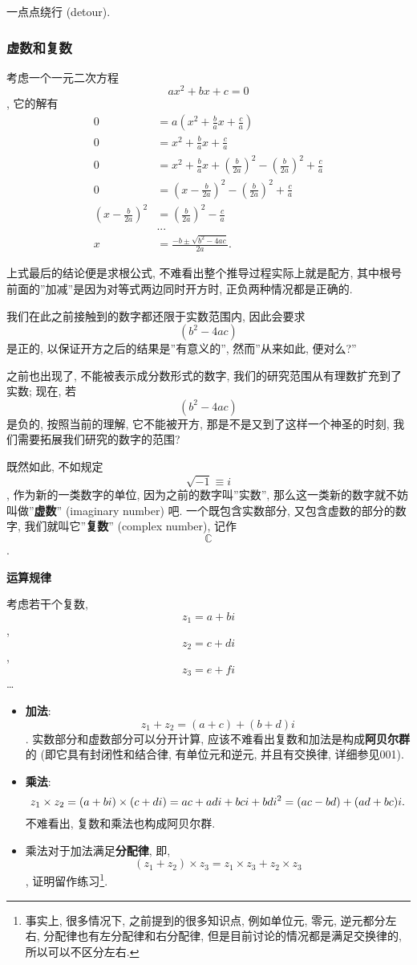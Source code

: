 一点点绕行 (detour).

\hypertarget{ux865aux6570ux548cux590dux6570}{%
\subsubsection{虚数和复数}\label{ux865aux6570ux548cux590dux6570}}

考虑一个一元二次方程 \[ax^2+bx+c=0\], 它的解有 \[
\begin{align*}
0&=a\left(x^2+\frac{b}{a}x+\frac{c}{a}\right)\\
0&=x^2+\frac{b}{a}x+\frac{c}{a}\\
0&=x^2+\frac{b}{a}x+\left(\frac{b}{2a}\right)^2-\left(\frac{b}{2a}\right)^2+\frac{c}{a}\\
0&=\left(x-\frac{b}{2a}\right)^2-\left(\frac{b}{2a}\right)^2+\frac{c}{a}\\
\left(x-\frac{b}{2a}\right)^2&=\left(\frac{b}{2a}\right)^2-\frac{c}{a}\\
&...\\
x&=\boxed{\frac{-b\pm\sqrt{b^2-4ac}}{2a}}.
\end{align*}
\]

上式最后的结论便是求根公式, 不难看出整个推导过程实际上就是配方,
其中根号前面的''加减''是因为对等式两边同时开方时,
正负两种情况都是正确的.

我们在此之前接触到的数字都还限于实数范围内, 因此会要求
\[\left(b^2-4ac\right)\] 是正的, 以保证开方之后的结果是''有意义的'',
然而''从来如此, 便对么?''

之前也出现了, 不能被表示成分数形式的数字,
我们的研究范围从有理数扩充到了实数; 现在, 若 \[\left(b^2-4ac\right)\]
是负的, 按照当前的理解, 它不能被开方, 那是不是又到了这样一个神圣的时刻,
我们需要拓展我们研究的数字的范围?

既然如此, 不如规定 \[\sqrt{-1}\equiv i\], 作为新的一类数字的单位,
因为之前的数字叫''实数'', 那么这一类新的数字就不妨叫做''\textbf{虚数}''
(imaginary number) 吧. 一个既包含实数部分, 又包含虚数的部分的数字,
我们就叫它''\textbf{复数}'' (complex number), 记作 \[\mathbb{C}\].

\textbf{运算规律}

考虑若干个复数, \[z_1=a+bi\], \[z_2=c+di\], \[z_3=e+fi\]\ldots{}

\begin{itemize}
\tightlist
\item
  \textbf{加法}: \[z_1+z_2=(a+c)+(b+d)i\].
  实数部分和虚数部分可以分开计算,
  应该不难看出复数和加法是构成\textbf{阿贝尔群}的
  (即它具有封闭性和结合律, 有单位元和逆元, 并且有交换律, 详细参见001).
\item
  \textbf{乘法}:
  \[z_1\times z_2=(a+bi)\times(c+di)\\=ac+adi+bci+bdi^2=(ac-bd)+(ad+bc)i.\]
  不难看出, 复数和乘法也构成阿贝尔群.
\item
  乘法对于加法满足\textbf{分配律}, 即,
  \[(z_1+z_2)\times z_3=z_1\times z_3+z_2\times z_3\],
  证明留作练习\footnote{事实上, 很多情况下, 之前提到的很多知识点,
    例如单位元, 零元, 逆元都分左右, 分配律也有左分配律和右分配律,
    但是目前讨论的情况都是满足交换律的, 所以可以不区分左右.}.
\end{itemize}

